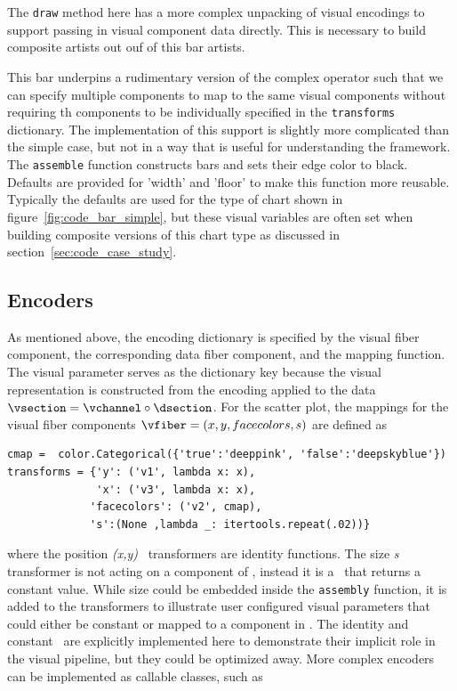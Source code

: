 \documentclass[../main.tex]{subfiles}
\begin{document}
\begin{verbatim}

    
\end{verbatim}
The \texttt{draw} method here has a more complex unpacking of visual encodings to support passing in visual component data directly. This is necessary to build composite artists out ouf of this bar artists. 

This bar underpins a rudimentary version of the complex \plus operator such that we can specify multiple components to map to the same visual components without requiring th components to be individually specified in the \texttt{transforms} dictionary. The implementation of this support is slightly more complicated than the simple case, but not in a way that is useful for understanding the framework. The \texttt{assemble} function constructs bars and sets their edge color to black. Defaults are provided for 'width' and 'floor' to make this function more reusable. Typically the defaults are used for the type of chart shown in figure~\ref{fig:code_bar_simple}, but these visual variables are often set when building composite versions of this chart type as discussed in section~\ref{sec:code_case_study}. 


\subsection{Encoders \vchannel}
\label{sec:code_channels}
As mentioned above, the encoding dictionary is specified by the visual fiber component, the corresponding data fiber component, and the mapping function. The visual parameter serves as the dictionary key because the visual representation is constructed from the encoding applied to the data  $\vsection = \vchannel \circ \dsection$. For the scatter plot, the mappings for the visual fiber components $\vfiber=(x,y, facecolors, s)$ are defined as
\begin{verbatim}
cmap =  color.Categorical({'true':'deeppink', 'false':'deepskyblue'})
transforms = {'y': ('v1', lambda x: x),       
              'x': ('v3', lambda x: x),
             'facecolors': ('v2', cmap), 
             's':(None ,lambda _: itertools.repeat(.02))}
\end{verbatim}
where the position \textit{(x,y)} \vchannel\ transformers are identity functions. The size \textit{s} transformer is not acting on a component of \dfiber, instead it is a \vchannel\ that returns a constant value. While size could be embedded inside the \texttt{assembly} function, it is added to the transformers to illustrate user configured visual parameters that could either be constant or mapped to a component in \dfiber. The identity and constant \vchannel\ are explicitly implemented here to demonstrate their implicit role in the visual pipeline, but they could be optimized away. More complex encoders can be implemented as callable classes, such as 
\end{document}
